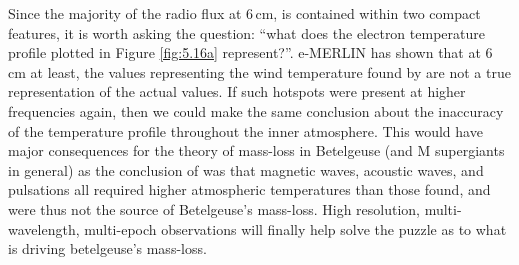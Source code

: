 Since the majority of the radio flux at 6\,cm, is contained within two compact features, it is worth asking the question: ``what does the electron temperature profile plotted in Figure \ref{fig:5.16a} represent?''. e-MERLIN  has shown that at 6\,cm at least, the values representing the wind temperature found by \cite{lim_1998} are not a true representation of the actual values. If such hotspots were present at higher frequencies again, then we could make the same conclusion about the inaccuracy of the temperature profile throughout the inner atmosphere. This would have major consequences for the theory of mass-loss in Betelgeuse (and M supergiants in general) as the conclusion of \cite{lim_1998} was that magnetic waves, acoustic waves, and pulsations all required higher atmospheric temperatures than those found, and were thus not the source of Betelgeuse's mass-loss. High resolution, multi-wavelength, multi-epoch observations will finally help solve the puzzle as to what is driving betelgeuse's mass-loss.


